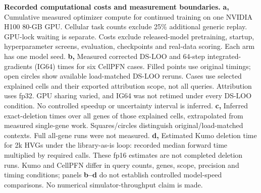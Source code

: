 \textbf{Recorded computational costs and measurement boundaries.}
\textbf{a,} Cumulative measured optimizer compute for continued training on one NVIDIA H100 80-GB GPU. Cellular task counts exclude 25\% additional generic replay. GPU-lock waiting is separate. Costs exclude released-model pretraining, startup, hyperparameter screens, evaluation, checkpoints and real-data scoring. Each arm has one model seed.
\textbf{b,} Measured corrected DS-LOO and 64-step integrated-gradients (IG64) times for six CellPFN cases. Filled points use original timings; open circles show available load-matched DS-LOO reruns. Cases use selected explained cells and their exported attribution scope, not all queries. Attribution uses fp32. GPU sharing varied, and IG64 was not retimed under every DS-LOO condition. No controlled speedup or uncertainty interval is inferred.
\textbf{c,} Inferred exact-deletion times over all genes of those explained cells, extrapolated from measured single-gene work. Squares/circles distinguish original/load-matched contexts. Full all-gene runs were not measured.
\textbf{d,} Estimated Kumo deletion time for 2k HVGs under the library-as-is loop: recorded median forward time multiplied by required calls. These fp16 estimates are not completed deletion runs. Kumo and CellPFN differ in query counts, genes, scope, precision and timing conditions; panels \textbf{b--d} do not establish controlled model-speed comparisons. No numerical simulator-throughput claim is made.

